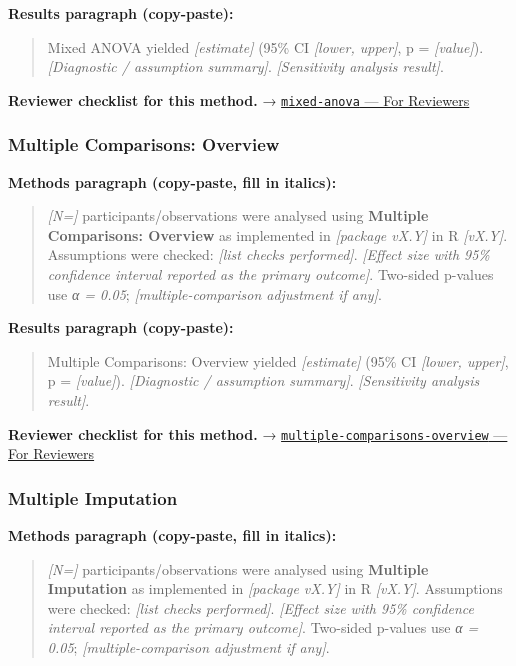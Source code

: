 \documentclass[
]{article}
\begin{document}
\textbf{Results paragraph (copy-paste):}

\begin{quote}
Mixed ANOVA yielded \emph{{[}estimate{]}} (95\% CI \emph{{[}lower,
upper{]}}, p = \emph{{[}value{]}}). \emph{{[}Diagnostic / assumption
summary{]}}. \emph{{[}Sensitivity analysis result{]}}.
\end{quote}

\textbf{Reviewer checklist for this method.} →
\href{../chapters/04-inferential/mixed-anova.Rmd\#for-reviewers}{\texttt{mixed-anova}
--- For Reviewers}

\subsubsection{Multiple Comparisons:
Overview}\label{multiple-comparisons-overview}

\textbf{Methods paragraph (copy-paste, fill in italics):}

\begin{quote}
\emph{{[}N={]}} participants/observations were analysed using
\textbf{Multiple Comparisons: Overview} as implemented in
\emph{{[}package vX.Y{]}} in R \emph{{[}vX.Y{]}}. Assumptions were
checked: \emph{{[}list checks performed{]}}. \emph{{[}Effect size with
95\% confidence interval reported as the primary outcome{]}}. Two-sided
p-values use \emph{α = 0.05}; \emph{{[}multiple-comparison adjustment if
any{]}}.
\end{quote}

\textbf{Results paragraph (copy-paste):}

\begin{quote}
Multiple Comparisons: Overview yielded \emph{{[}estimate{]}} (95\% CI
\emph{{[}lower, upper{]}}, p = \emph{{[}value{]}}). \emph{{[}Diagnostic
/ assumption summary{]}}. \emph{{[}Sensitivity analysis result{]}}.
\end{quote}

\textbf{Reviewer checklist for this method.} →
\href{../chapters/04-inferential/multiple-comparisons-overview.Rmd\#for-reviewers}{\texttt{multiple-comparisons-overview}
--- For Reviewers}

\subsubsection{Multiple Imputation}\label{multiple-imputation}

\textbf{Methods paragraph (copy-paste, fill in italics):}

\begin{quote}
\emph{{[}N={]}} participants/observations were analysed using
\textbf{Multiple Imputation} as implemented in \emph{{[}package vX.Y{]}}
in R \emph{{[}vX.Y{]}}. Assumptions were checked: \emph{{[}list checks
performed{]}}. \emph{{[}Effect size with 95\% confidence interval
reported as the primary outcome{]}}. Two-sided p-values use \emph{α =
0.05}; \emph{{[}multiple-comparison adjustment if any{]}}.
\end{quote}
\end{document}
